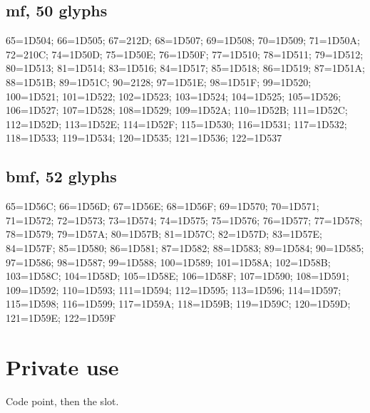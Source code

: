 \subsection*{mf, 50 glyphs}
\raggedright\small 65=1D504; 66=1D505; 67=212D; 68=1D507; 69=1D508; 70=1D509;
71=1D50A; 72=210C; 74=1D50D; 75=1D50E; 76=1D50F; 77=1D510; 78=1D511; 79=1D512;
80=1D513; 81=1D514; 83=1D516; 84=1D517; 85=1D518; 86=1D519; 87=1D51A; 88=1D51B;
89=1D51C; 90=2128; 97=1D51E; 98=1D51F; 99=1D520; 100=1D521; 101=1D522;
102=1D523; 103=1D524; 104=1D525; 105=1D526; 106=1D527; 107=1D528; 108=1D529;
109=1D52A; 110=1D52B; 111=1D52C; 112=1D52D; 113=1D52E; 114=1D52F; 115=1D530;
116=1D531; 117=1D532; 118=1D533; 119=1D534; 120=1D535; 121=1D536; 122=1D537\par

\subsection*{bmf, 52 glyphs}
\raggedright\small 65=1D56C; 66=1D56D; 67=1D56E; 68=1D56F; 69=1D570; 70=1D571;
71=1D572; 72=1D573; 73=1D574; 74=1D575; 75=1D576; 76=1D577; 77=1D578; 78=1D579;
79=1D57A; 80=1D57B; 81=1D57C; 82=1D57D; 83=1D57E; 84=1D57F; 85=1D580; 86=1D581;
87=1D582; 88=1D583; 89=1D584; 90=1D585; 97=1D586; 98=1D587; 99=1D588;
100=1D589; 101=1D58A; 102=1D58B; 103=1D58C; 104=1D58D; 105=1D58E; 106=1D58F;
107=1D590; 108=1D591; 109=1D592; 110=1D593; 111=1D594; 112=1D595; 113=1D596;
114=1D597; 115=1D598; 116=1D599; 117=1D59A; 118=1D59B; 119=1D59C; 120=1D59D;
121=1D59E; 122=1D59F\par

\section{Private use}\label{app:pua}

Code point, then the slot.

